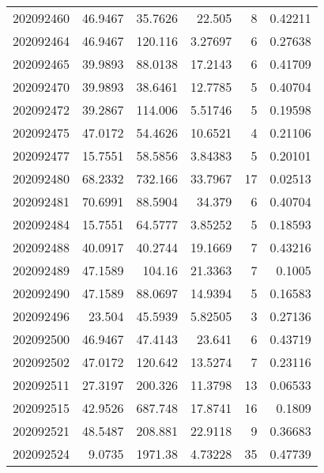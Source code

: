 \begin{tabular}{rrrrrr}
 202092460 &         46.9467  &       35.7626 &           22.505   &           8 & 0.42211 \\
 202092464 &         46.9467  &      120.116  &            3.27697 &           6 & 0.27638 \\
 202092465 &         39.9893  &       88.0138 &           17.2143  &           6 & 0.41709 \\
 202092470 &         39.9893  &       38.6461 &           12.7785  &           5 & 0.40704 \\
 202092472 &         39.2867  &      114.006  &            5.51746 &           5 & 0.19598 \\
 202092475 &         47.0172  &       54.4626 &           10.6521  &           4 & 0.21106 \\
 202092477 &         15.7551  &       58.5856 &            3.84383 &           5 & 0.20101 \\
 202092480 &         68.2332  &      732.166  &           33.7967  &          17 & 0.02513 \\
 202092481 &         70.6991  &       88.5904 &           34.379   &           6 & 0.40704 \\
 202092484 &         15.7551  &       64.5777 &            3.85252 &           5 & 0.18593 \\
 202092488 &         40.0917  &       40.2744 &           19.1669  &           7 & 0.43216 \\
 202092489 &         47.1589  &      104.16   &           21.3363  &           7 & 0.1005  \\
 202092490 &         47.1589  &       88.0697 &           14.9394  &           5 & 0.16583 \\
 202092496 &         23.504   &       45.5939 &            5.82505 &           3 & 0.27136 \\
 202092500 &         46.9467  &       47.4143 &           23.641   &           6 & 0.43719 \\
 202092502 &         47.0172  &      120.642  &           13.5274  &           7 & 0.23116 \\
 202092511 &         27.3197  &      200.326  &           11.3798  &          13 & 0.06533 \\
 202092515 &         42.9526  &      687.748  &           17.8741  &          16 & 0.1809  \\
 202092521 &         48.5487  &      208.881  &           22.9118  &           9 & 0.36683 \\
 202092524 &          9.0735  &     1971.38   &            4.73228 &          35 & 0.47739 \\

\end{tabular}

